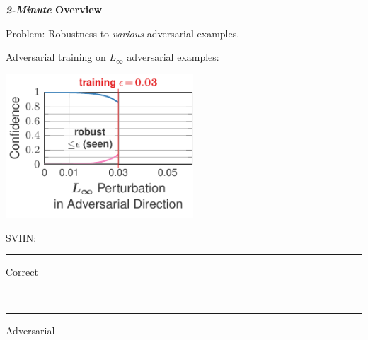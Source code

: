 \documentclass[64pt]{beamer}
\begin{document}
	\begin{frame}[t]{\bfseries \textit{2-Minute} Overview}
		\Large
		
		Problem: Robustness to \emph{various} adversarial examples.
		\vskip 0.25cm
		
		Adversarial training on $L_\infty$ adversarial examples:
		\vskip -0.25cm 
		\begin{minipage}[t]{0.7\textwidth}
			\vspace*{0px}
			\hfill
			\includegraphics[width=7cm]{fig/introduction/advtrain_1_adversarial_seen}
		\end{minipage}
		\hfill
		\begin{minipage}[t]{0.28\textwidth}
			\vspace*{15px}
			
			\begin{tcolorbox}[
				left=0pt,
				right=0pt,
				top=0pt,
				bottom=0pt,
				colback=gray!12!white,
				colframe=gray!12!white,
				width=1\textwidth, 
				enlarge left by=0mm,
				boxsep=5pt,
				arc=0pt,outer arc=0pt,
				boxrule=1pt,
				]
				\large\color{MPIIblack}
				SVHN:\\
				\textcolor{colorbrewer2}{{\rule[4pt]{10pt}{2pt} Correct}}\\ \textcolor{colorbrewer8}{{\rule[4pt]{10pt}{2pt} Adversarial}}
			\end{tcolorbox}
		\end{minipage}
	\end{frame}
\end{document}

